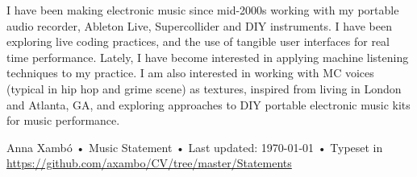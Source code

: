 \documentclass[10pt, a4paper]{article}
\begin{document}
I have been making electronic music since mid-2000s working with my portable audio recorder, Ableton Live, Supercollider and DIY instruments. I have been exploring live coding practices, and the use of tangible user interfaces for real time performance. Lately, I have become interested in applying machine listening techniques to my practice. I am also interested in working with MC voices (typical in hip hop and grime scene) as textures, inspired from living in London and Atlanta, GA, and exploring approaches to DIY portable electronic music kits for music performance. 

\vfill{}

\begin{center}
{\scriptsize  Anna Xambó •\- Music Statement •\- Last updated: \today\- •\- %
Typeset in \href{http://nitens.org/taraborelli/cvtex}{
\XeTeX }\\
\href{https://github.com/axambo/CV/tree/master/Statements}{https://github.com/axambo/CV/tree/master/Statements}}
\end{center}
\end{document}
